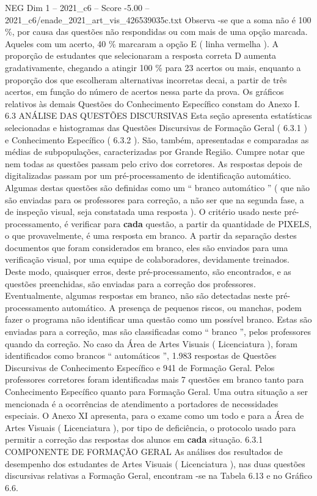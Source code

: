 \begin{textsample}{NEG Dim 1 – 2021\_c6 – Score -5.00 – 2021\_c6/enade\_2021\_art\_vis\_426539035c.txt}
Observa -se que a soma não é 100 \%, por causa das questões não respondidas ou com mais de uma opção marcada.
Aqueles com um acerto, 40 \% marcaram a opção E ( linha vermelha ).
A proporção de estudantes que selecionaram a resposta correta D aumenta gradativamente, chegando a atingir 100 \% para 23 acertos ou mais, enquanto a proporção dos que escolheram alternativas incorretas decai, a partir de três acertos, em função do número de acertos nessa parte da prova.
Os gráficos relativos às demais Questões do Conhecimento Específico constam do Anexo I. 6.3 ANÁLISE DAS QUESTÕES DISCURSIVAS Esta seção apresenta estatísticas selecionadas e histogramas das Questões Discursivas de Formação Geral ( 6.3.1 ) e Conhecimento Específico ( 6.3.2 ).
São, também, apresentadas e comparadas as médias de subpopulações, caracterizadas por Grande Região.
Cumpre notar que nem todas as questões passam pelo crivo dos corretores.
As respostas depois de digitalizadas passam por um pré-processamento de identificação automático.
Algumas destas questões são definidas como um “ branco automático ” ( que não são enviadas para os professores para correção, a não ser que na segunda fase, a de inspeção visual, seja constatada uma resposta ).
O critério usado neste pré-processamento, é verificar para \textbf{cada} questão, a partir da quantidade de PIXELS, o que provavelmente, é uma resposta em branco.
A partir da separação destes documentos que foram considerados em branco, eles são enviados para uma verificação visual, por uma equipe de colaboradores, devidamente treinados.
Deste modo, quaisquer erros, deste pré-processamento, são encontrados, e as questões preenchidas, são enviadas para a correção dos professores.
Eventualmente, algumas respostas em branco, não são detectadas neste pré-processamento automático.
A presença de pequenos riscos, ou manchas, podem fazer o programa não identificar uma questão como um possível branco.
Estas são enviadas para a correção, mas são classificadas como “ branco ”, pelos professores quando da correção.
No caso da Área de Artes Visuais ( Licenciatura ), foram identificados como brancos “ automáticos ”, 1.983 respostas de Questões Discursivas de Conhecimento Específico e 941 de Formação Geral.
Pelos professores corretores foram identificadas mais 7 questões em branco tanto para Conhecimento Específico quanto para Formação Geral.
Uma outra situação a ser mencionada é a ocorrências de atendimento a portadores de necessidades especiais.
O Anexo XI apresenta, para o exame como um todo e para a Área de Artes Visuais ( Licenciatura ), por tipo de deficiência, o protocolo usado para permitir a correção das respostas dos alunos em \textbf{cada} situação. 6.3.1 COMPONENTE DE FORMAÇÃO GERAL As análises dos resultados de desempenho dos estudantes de Artes Visuais ( Licenciatura ), nas duas questões discursivas relativas a Formação Geral, encontram -se na Tabela 6.13 e no Gráfico 6.6.

\end{textsample}
